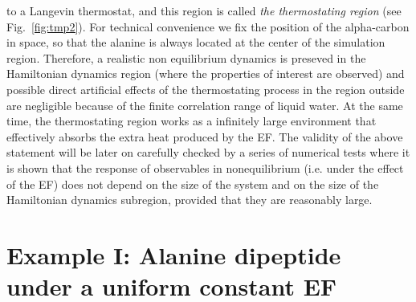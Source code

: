 \documentclass[a4paper,preprint,unsortedaddress,onecolumn]{revtex4-1}
\begin{document}
to a Langevin thermostat, and this region is called \emph{the thermostating
region} (see Fig.~\ref{fig:tmp2}). For technical convenience we
fix the position of the alpha-carbon in space, so that the alanine is always
located at the center of the simulation region.
Therefore, a realistic non equilibrium  dynamics is preseved in the Hamiltonian dynamics region (where the properties of interest are observed)
and possible direct artificial effects of the thermostating process in the region outside are negligible because of the finite correlation
range of liquid water.
At the same time, the thermostating region works as a infinitely large
environment that effectively absorbs the extra heat produced by the EF.
The validity of the above
statement will be later on carefully checked by a series of numerical tests where it is shown that
the response of observables in nonequilibrium (i.e. under the effect of the EF) does not depend on the size of the system
and on the size of the Hamiltonian dynamics subregion, provided that they are
reasonably large.



\section{Example I: Alanine dipeptide
  under a uniform  constant EF}
\end{document}
